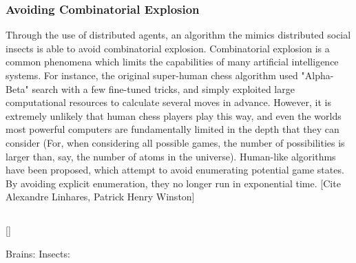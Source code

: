 \documentclass{nature}
\begin{document}
    \subsubsection{Avoiding Combinatorial Explosion}
        Through the use of distributed agents, an algorithm the mimics distributed social insects is able to avoid combinatorial explosion.
        Combinatorial explosion is a common phenomena which limits the capabilities of many artificial intelligence systems.
        For instance, the original super-human chess algorithm used "Alpha-Beta" search with a few fine-tuned tricks, and simply exploited large computational resources to calculate several moves in advance.
        However, it is extremely unlikely that human chess players play this way, and even the worlds most powerful computers are fundamentally limited in the depth that they can consider (For, when considering all possible games, the number of possibilities is larger than, say, the number of atoms in the universe).
        Human-like algorithms have been proposed, which attempt to avoid enumerating potential game states. 
        By avoiding explicit enumeration, they no longer run in exponential time.
        [Cite Alexandre Linhares, Patrick Henry Winston]
\subsection{}
    []

Brains:
\cite{koch_1999}
Insects:
\cite{fewell_2003}


\end{document}
